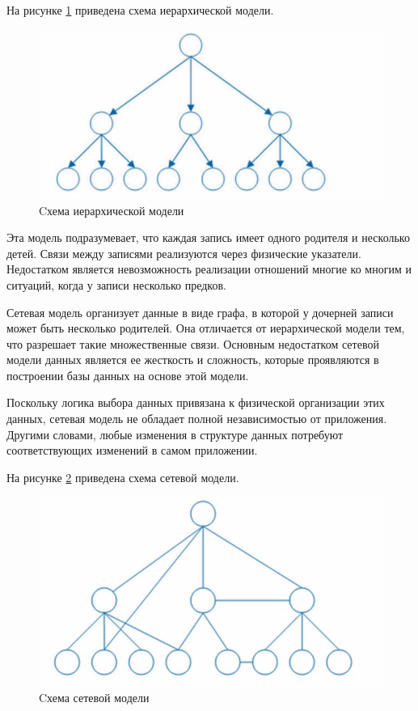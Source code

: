 На рисунке \ref{img:hierachy} приведена схема иерархической модели.

\begin{figure}[h]
	\centering
	\includegraphics[height=0.25\textheight]{img/hierachy.png}
	\caption{Cхема иерархической модели \cite{roders}}
	\label{img:hierachy}
\end{figure}

Эта модель подразумевает, что каждая запись имеет одного родителя и несколько детей.
Связи между записями реализуются через физические указатели.
Недостатком является невозможность реализации отношений многие ко многим и ситуаций, когда у записи несколько предков.

Сетевая модель организует данные в виде графа, в которой у дочерней записи может быть несколько родителей.
Она отличается от иерархической модели тем, что разрешает такие множественные связи.
Основным недостатком сетевой модели данных является ее жесткость и сложность, которые проявляются в построении базы данных на основе этой модели.

Поскольку логика выбора данных привязана к физической организации этих данных, сетевая модель не обладает полной независимостью от приложения.
Другими словами, любые изменения в структуре данных потребуют соответствующих изменений в самом приложении.

На рисунке \ref{img:setevoy} приведена схема сетевой модели.

\begin{figure}[h]
	\centering
	\includegraphics[height=0.25\textheight]{img/setevoy.png}
	\caption{Cхема сетевой модели \cite{roders}}
	\label{img:setevoy}
\end{figure}

